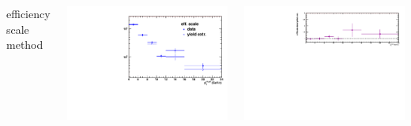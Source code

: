 \documentclass[xcolor={usenames,dvipsnames}]{beamer}
\begin{document}
\begin{frame}
\begin{columns}[c]
\column{5.5cm} 
\footnotesize{efficiency scale method}
\begin{minipage}{1.\linewidth}
\includegraphics[width=0.95\linewidth]{img/rawYieldpPb/jetPtComparison_DataMVariation_effScale.pdf}
\end{minipage}
\begin{minipage}{1.\linewidth}
\includegraphics[width=0.95\linewidth]{img/rawYieldpPb/EffScaleRatio.pdf}
\end{minipage}
	
\end{columns}
\end{frame}
\end{document}
